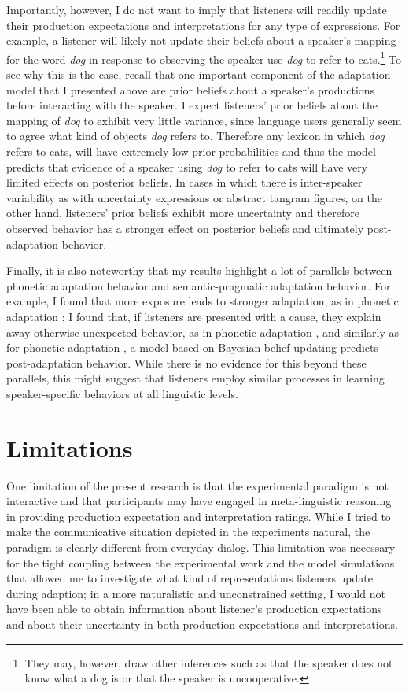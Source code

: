 Importantly, however, I do not want to imply that listeners will readily update their production expectations and interpretations for any type of expressions. For example, a listener will likely not
update their beliefs about a speaker's mapping for the word \textit{dog} in response to observing the speaker use \textit{dog} to refer to cats.\footnote{They may, however, draw other inferences such as that the speaker does not know what a dog is or that the speaker is uncooperative.} To see why this is the case, recall that one important component of the adaptation model that I presented above are prior beliefs about a speaker's productions before interacting with the speaker. I expect listeners' prior beliefs about the mapping of \textit{dog} to exhibit very little variance, since language users generally seem to agree what kind of objects \textit{dog} refers to. Therefore any lexicon in which \textit{dog} refers to cats, will have extremely low prior probabilities and thus the model predicts that evidence of a speaker using \textit{dog} to refer to cats will have very limited effects on posterior beliefs. In cases in which there is inter-speaker variability as with uncertainty expressions or abstract tangram figures, on the other hand,  listeners' prior beliefs exhibit more uncertainty and therefore observed behavior has a stronger effect on posterior beliefs and ultimately post-adaptation behavior.

Finally, it is also noteworthy that my results highlight a lot of parallels between phonetic adaptation behavior and semantic-pragmatic adaptation behavior. For example, I found that more exposure leads to stronger adaptation, as in phonetic adaptation \parencite{Vroomen2007}; I found that,  if listeners are presented with a cause,  they explain away otherwise unexpected behavior, as in phonetic adaptation \parencite{Kraljic2008}, and similarly as for phonetic adaptation \parencite{Kleinschmidt2015}, a model based on Bayesian belief-updating predicts post-adaptation behavior. While there is no evidence for this beyond these parallels, this might suggest that listeners employ similar processes in learning speaker-specific behaviors at all linguistic levels.



\section{Limitations}

One limitation of the present research is that the experimental paradigm is not interactive and that participants may have 
engaged in meta-linguistic reasoning in providing production expectation and interpretation ratings. 
While I tried to make the communicative situation depicted in the experiments natural,
the paradigm is clearly different from everyday dialog. This limitation was necessary for the tight coupling between the experimental work
and the model simulations that allowed me to investigate what kind of representations listeners update during adaption; in a more
naturalistic and unconstrained setting, I would not have been able to obtain information about listener's production expectations and about their
uncertainty in both production expectations and interpretations. 

